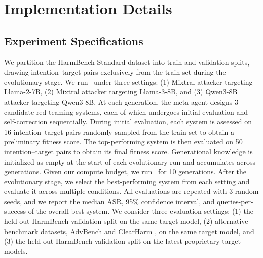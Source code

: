 \clearpage
\section{Implementation Details}
\label{appx: implementation details}

\subsection{Experiment Specifications}
\label{appx: experiment specifications}
We partition the HarmBench Standard dataset into train and validation splits, drawing intention--target pairs exclusively from the train set during the evolutionary stage. We run \method~under three settings: (1) Mixtral attacker targeting Llama-2-7B, (2) Mixtral attacker targeting Llama-3-8B, and (3) Qwen3-8B attacker targeting Qwen3-8B. At each generation, the meta-agent designs 3 candidate red-teaming systems, each of which undergoes initial evaluation and self-correction sequentially. During initial evaluation, each system is assessed on 16 intention--target pairs randomly sampled from the train set to obtain a preliminary fitness score. The top-performing system is then evaluated on 50 intention--target pairs to obtain its final fitness score. Generational knowledge is initialized as empty at the start of each evolutionary run and accumulates across generations. Given our compute budget, we run \method~for 10 generations.
After the evolutionary stage, we select the best-performing system from each setting and evaluate it across multiple conditions. All evaluations are repeated with 3 random seeds, and we report the median ASR, 95\% confidence interval, and queries-per-success of the overall best system. We consider three evaluation settings: (1) the held-out HarmBench validation split on the same target model, (2) alternative benchmark datasets, AdvBench \citep{chen2022should} and ClearHarm \citep{hollinsworth2025clearharm}, on the same target model, and (3) the held-out HarmBench validation split on the latest proprietary target models.

